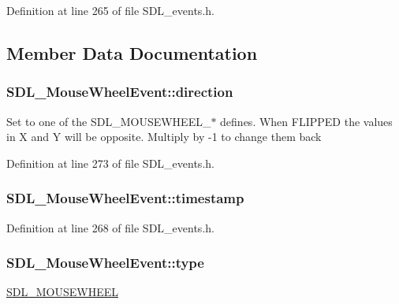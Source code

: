 Definition at line 265 of file S\-D\-L\-\_\-events.\-h.



\subsection{Member Data Documentation}
\hypertarget{struct_s_d_l___mouse_wheel_event_a9fc46552d116499e5b8ca89d66df932c}{
\subsubsection[{direction}]{ S\-D\-L\-\_\-\-Mouse\-Wheel\-Event\-::direction}}\label{struct_s_d_l___mouse_wheel_event_a9fc46552d116499e5b8ca89d66df932c}
Set to one of the S\-D\-L\-\_\-\-M\-O\-U\-S\-E\-W\-H\-E\-E\-L\-\_\-$\ast$ defines. When F\-L\-I\-P\-P\-E\-D the values in X and Y will be opposite. Multiply by -\/1 to change them back 

Definition at line 273 of file S\-D\-L\-\_\-events.\-h.

\hypertarget{struct_s_d_l___mouse_wheel_event_a83ad52c80ff49a8e75dc6c33bba65fa0}{
\subsubsection[{timestamp}]{ S\-D\-L\-\_\-\-Mouse\-Wheel\-Event\-::timestamp}}\label{struct_s_d_l___mouse_wheel_event_a83ad52c80ff49a8e75dc6c33bba65fa0}


Definition at line 268 of file S\-D\-L\-\_\-events.\-h.

\hypertarget{struct_s_d_l___mouse_wheel_event_aa6b741e99df708c6f9550ee0f520fb70}{
\subsubsection[{type}]{ S\-D\-L\-\_\-\-Mouse\-Wheel\-Event\-::type}}\label{struct_s_d_l___mouse_wheel_event_aa6b741e99df708c6f9550ee0f520fb70}
\hyperlink{_s_d_l__events_8h_a3b589e89be6b35c02e0dd34a55f3fccaa63135c2e0aea2286f05066f3c0bc5c4e}{S\-D\-L\-\_\-\-M\-O\-U\-S\-E\-W\-H\-E\-E\-L} 

